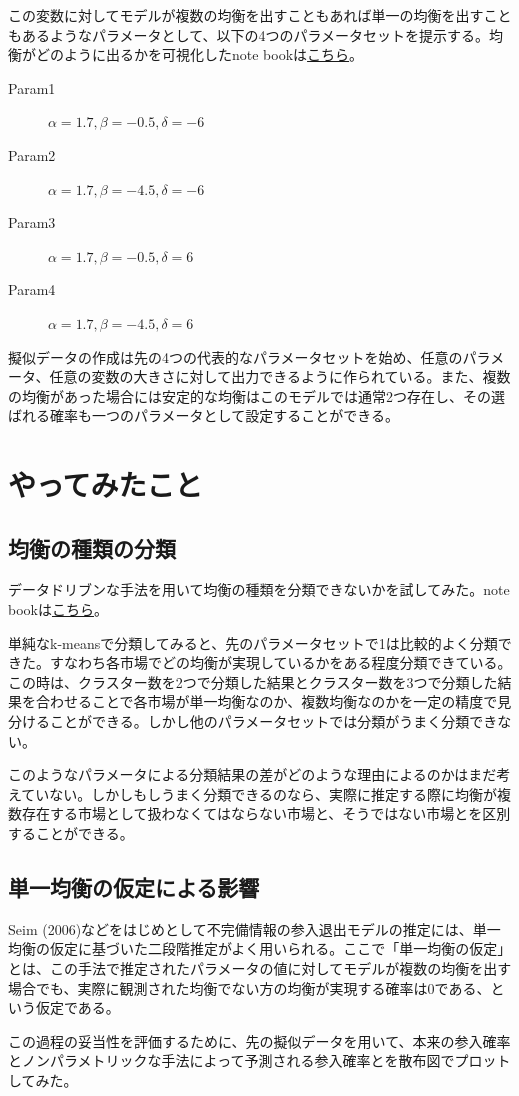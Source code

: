 \documentclass{jsarticle}
\begin{document}
この変数に対してモデルが複数の均衡を出すこともあれば単一の均衡を出すこともあるようなパラメータとして、以下の4つのパラメータセットを提示する。均衡がどのように出るかを可視化したnote bookは\href{https://github.com/keiikegami/multiplicity/blob/master/best_response_function.ipynb}{こちら}。
\begin{description}
	\item[Param1] $\alpha = 1.7, \beta = -0.5, \delta = -6$
	\item[Param2] $\alpha = 1.7, \beta = -4.5, \delta = -6$
	\item[Param3] $\alpha = 1.7, \beta = -0.5, \delta = 6$
	\item[Param4] $\alpha = 1.7, \beta = -4.5, \delta = 6$
\end{description}
擬似データの作成は先の4つの代表的なパラメータセットを始め、任意のパラメータ、任意の変数の大きさに対して出力できるように作られている。また、複数の均衡があった場合には安定的な均衡はこのモデルでは通常2つ存在し、その選ばれる確率も一つのパラメータとして設定することができる。

\section{やってみたこと}
\subsection{均衡の種類の分類}
データドリブンな手法を用いて均衡の種類を分類できないかを試してみた。note bookは\href{https://github.com/keiikegami/multiplicity/blob/master/prediction2.ipynb}{こちら}。

単純なk-meansで分類してみると、先のパラメータセットで1は比較的よく分類できた。すなわち各市場でどの均衡が実現しているかをある程度分類できている。この時は、クラスター数を2つで分類した結果とクラスター数を3つで分類した結果を合わせることで各市場が単一均衡なのか、複数均衡なのかを一定の精度で見分けることができる。しかし他のパラメータセットでは分類がうまく分類できない。

このようなパラメータによる分類結果の差がどのような理由によるのかはまだ考えていない。しかしもしうまく分類できるのなら、実際に推定する際に均衡が複数存在する市場として扱わなくてはならない市場と、そうではない市場とを区別することができる。

\subsection{単一均衡の仮定による影響}
Seim (2006)などをはじめとして不完備情報の参入退出モデルの推定には、単一均衡の仮定に基づいた二段階推定がよく用いられる。ここで「単一均衡の仮定」とは、この手法で推定されたパラメータの値に対してモデルが複数の均衡を出す場合でも、実際に観測された均衡でない方の均衡が実現する確率は0である、という仮定である。

この過程の妥当性を評価するために、先の擬似データを用いて、本来の参入確率とノンパラメトリックな手法によって予測される参入確率とを散布図でプロットしてみた。
\end{document}

